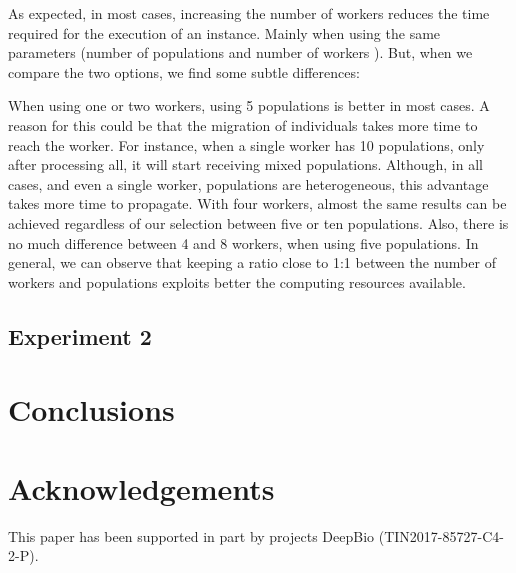 \documentclass[review]{elsarticle}
\begin{document}
As expected, in most cases, increasing the number of workers reduces the time
required for the execution of an instance. Mainly when using the same parameters
(number of populations and number of workers ). But, when we compare the two
options, we find some subtle differences:

When using one or two workers, using 5 populations is better in most cases. A
reason for this could be that the migration of individuals takes more time to
reach the worker. For instance, when a single worker has 10 populations, only
after processing all, it will start receiving mixed populations.  Although, in
all cases, and even a single worker, populations are heterogeneous, this
advantage takes more time to propagate. With four workers, almost the same
results can be achieved regardless of our selection between five or ten
populations. Also, there is no much difference between 4 and 8 workers, when
using five populations. In general, we can observe that keeping a ratio close to
1:1 between the number of workers and populations exploits better the computing
resources available.


\subsection{Experiment 2}
\label{sec:exp2results}


\section{Conclusions} 
\label{conclusions}

\section{Acknowledgements}

This paper has been supported in part by projects DeepBio
(TIN2017-85727-C4-2-P).



\end{document}
